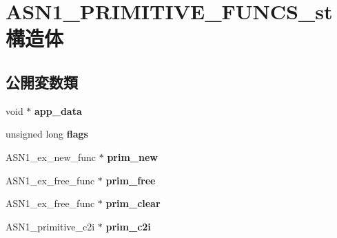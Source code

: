 \hypertarget{struct_a_s_n1___p_r_i_m_i_t_i_v_e___f_u_n_c_s__st}{}\section{A\+S\+N1\+\_\+\+P\+R\+I\+M\+I\+T\+I\+V\+E\+\_\+\+F\+U\+N\+C\+S\+\_\+st 構造体}
\label{struct_a_s_n1___p_r_i_m_i_t_i_v_e___f_u_n_c_s__st}
\subsection*{公開変数類}
\begin{DoxyCompactItemize}
\item 
\hypertarget{struct_a_s_n1___p_r_i_m_i_t_i_v_e___f_u_n_c_s__st_a4ab6489e068922032976724d4bb02644}{}void $\ast$ {\bfseries app\+\_\+data}\label{struct_a_s_n1___p_r_i_m_i_t_i_v_e___f_u_n_c_s__st_a4ab6489e068922032976724d4bb02644}

\item 
\hypertarget{struct_a_s_n1___p_r_i_m_i_t_i_v_e___f_u_n_c_s__st_a9ea38cfb70abc1afd0fe8f272015737b}{}unsigned long {\bfseries flags}\label{struct_a_s_n1___p_r_i_m_i_t_i_v_e___f_u_n_c_s__st_a9ea38cfb70abc1afd0fe8f272015737b}

\item 
\hypertarget{struct_a_s_n1___p_r_i_m_i_t_i_v_e___f_u_n_c_s__st_a0fe6cb24ad4850f35c72bdc080ad9c4a}{}A\+S\+N1\+\_\+ex\+\_\+new\+\_\+func $\ast$ {\bfseries prim\+\_\+new}\label{struct_a_s_n1___p_r_i_m_i_t_i_v_e___f_u_n_c_s__st_a0fe6cb24ad4850f35c72bdc080ad9c4a}

\item 
\hypertarget{struct_a_s_n1___p_r_i_m_i_t_i_v_e___f_u_n_c_s__st_a19634516049ebbaa076d9c1693580130}{}A\+S\+N1\+\_\+ex\+\_\+free\+\_\+func $\ast$ {\bfseries prim\+\_\+free}\label{struct_a_s_n1___p_r_i_m_i_t_i_v_e___f_u_n_c_s__st_a19634516049ebbaa076d9c1693580130}

\item 
\hypertarget{struct_a_s_n1___p_r_i_m_i_t_i_v_e___f_u_n_c_s__st_af2d9eebde7d5b07a096954e4e8129e09}{}A\+S\+N1\+\_\+ex\+\_\+free\+\_\+func $\ast$ {\bfseries prim\+\_\+clear}\label{struct_a_s_n1___p_r_i_m_i_t_i_v_e___f_u_n_c_s__st_af2d9eebde7d5b07a096954e4e8129e09}

\item 
\hypertarget{struct_a_s_n1___p_r_i_m_i_t_i_v_e___f_u_n_c_s__st_ad798e3c6d829661a8c5607d271454a4f}{}A\+S\+N1\+\_\+primitive\+\_\+c2i $\ast$ {\bfseries prim\+\_\+c2i}\label{struct_a_s_n1___p_r_i_m_i_t_i_v_e___f_u_n_c_s__st_ad798e3c6d829661a8c5607d271454a4f}


\end{DoxyCompactItemize}
